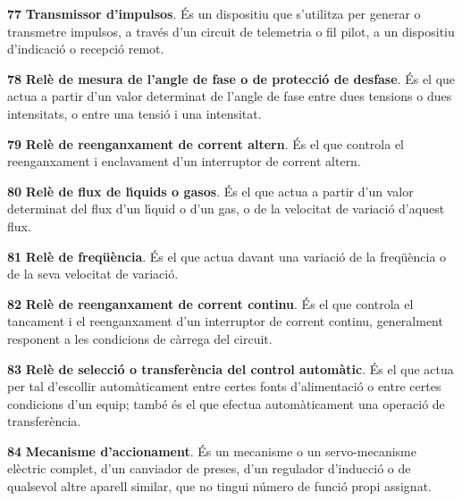 \begin{multicols}{2}
\begin{list}{}
\item[\textbf{77}]  \textbf{Transmissor d'impulsos}. \'{E}s un
 dispositiu que s'utilitza per generar o transmetre  impulsos, a trav\'{e}s d'un circuit de
telemetria o fil pilot, a un dispositiu d'indicaci\'{o} o recepci\'{o}
remot.

\item[\textbf{78}]  \textbf{Rel\`{e} de  mesura de l'angle de fase o de protecci\'{o}
de desfase}. \'{E}s el que actua a partir d'un valor determinat de
l'angle de fase entre dues tensions o dues intensitats, o entre una
tensi\'{o} i una intensitat.

\item[\textbf{79}]  \textbf{Rel\`{e} de
reenganxament de corrent altern}. \'{E}s el que controla el reenganxament i enclavament d'un
interruptor de corrent altern.

\item[\textbf{80}]  \textbf{Rel\`{e} de flux de l\'{\i}quids
o gasos}.
 \'{E}s el que actua a partir d'un valor determinat del flux d'un l\'{\i}quid o d'un gas, o de
 la  velocitat de variaci\'{o} d'aquest flux.

\item[\textbf{81}]  \textbf{Rel\`{e} de freq\"{u}\`{e}ncia}. \'{E}s el que actua
davant una variaci\'{o} de la freq\"{u}\`{e}ncia o de la seva velocitat de variaci\'{o}.

\item[\textbf{82}]  \textbf{Rel\`{e} de
reenganxament de corrent continu}. \'{E}s el que controla el tancament i el reenganxament d'un
interruptor de corrent continu, generalment responent a les condicions de c\`{a}rrega del
circuit.

\item[\textbf{83}] 
\textbf{Rel\`{e} de selecci\'{o} o transfer\`{e}ncia del control autom\`{a}tic}. \'{E}s
el que actua per tal d'escollir autom\`{a}ticament entre certes fonts
d'alimentaci\'{o} o entre certes condicions d'un equip; tamb\'{e} \'{e}s el que
efectua autom\`{a}ticament una operaci\'{o} de transfer\`{e}ncia.

\item[\textbf{84}]  \textbf{Mecanisme d'accionament}. \'{E}s un
mecanisme o un servo-mecanisme el\`{e}ctric complet,  d'un canviador de
preses, d'un regulador d'inducci\'{o} o de qualsevol altre aparell
similar, que no tingui n\'{u}mero de funci\'{o} propi assignat.


\end{list}
\end{multicols}

